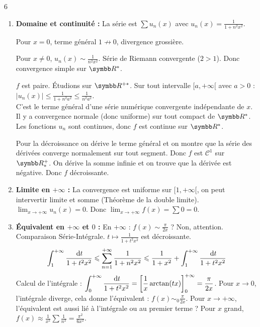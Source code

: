 \begin{correction}{6}
\begin{enumerate}
    \item \textbf{Domaine et continuité :}
    La série est $\sum u_n(x)$ avec $u_n(x) = \frac{1}{1+n^2 x^2}$.

    Pour $x=0$, terme général $1 \not\to 0$, divergence grossière.

    Pour $x \neq 0$, $u_n(x) \sim \frac{1}{n^2 x^2}$. Série de Riemann convergente ($2 > 1$).
    Donc convergence simple sur $\R^*$.

    $f$ est paire. Étudions sur $\R^{+*}$.
    Sur tout intervalle $[a, +\infty[$ avec $a>0$ :
    $|u_n(x)| \leqslant \frac{1}{1+n^2 a^2} \leqslant \frac{1}{n^2 a^2}$. \\
    C'est le terme général d'une série numérique convergente indépendante de $x$. \\
    Il y a convergence normale (donc uniforme) sur tout compact de $\R^*$.
    Les fonctions $u_n$ sont continues, donc $f$ est continue sur $\R^*$.

    Pour la décroissance on dérive le terme général et on montre que la série des dérivées converge normalement sur tout segment.
    Donc $f$ est $\mathscr C^1$ sur $\R^+_*$. On dérive la somme infinie et on trouve que la dérivée est négative.
    Donc $f$ décroissante.
    
    \item \textbf{Limite en $+\infty$ :}
    La convergence est uniforme sur $[1, +\infty[$, on peut intervertir limite et somme (Théorème de la double limite).
    $\lim_{x\to +\infty} u_n(x) = 0$.
    Donc $\lim_{x\to +\infty} f(x) = \sum 0 = 0$.

    \item \textbf{Équivalent en $+\infty$ et $0$ :}
    En $+\infty$ : $f(x) \sim \frac{\pi}{2x}$ ? Non, attention.
    Comparaison Série-Intégrale. $t \mapsto \frac{1}{1+t^2 x^2}$ est décroissante.
    \[\int_1^{+\infty} \frac{\,\mathrm{d}t}{1+t^2 x^2} \leqslant \sum_{n=1}^{+ \infty} \frac{1}{1+n^2 x^2} \leqslant \frac{1}{1+x^2} + \int_1^{+\infty} \frac{\,\mathrm{d}t}{1+t^2 x^2}\]
    Calcul de l'intégrale : $\displaystyle \int_0^{+\infty} \frac{\,\mathrm{d}t}{1+t^2 x^2} = \left[\frac{1}{x} \arctan(tx)\right]_0^{+\infty} = \frac{\pi}{2x}$.
    Pour $x \to 0$, l'intégrale diverge, cela donne l'équivalent : $f(x) \sim_0 \frac{\pi}{2x}$.
    Pour $x \to +\infty$, l'équivalent est aussi lié à l'intégrale ou au premier terme ?
    Pour $x$ grand, $f(x) \approx \frac{1}{x^2} \sum \frac{1}{n^2} = \frac{\pi^2}{6 x^2}$.
\end{enumerate}
\end{correction}

